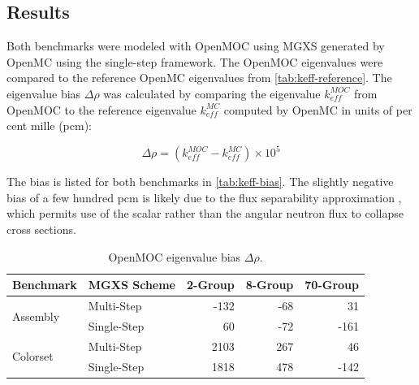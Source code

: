 \subsection{Results}
\label{subsec:results}

Both benchmarks were modeled with OpenMOC using MGXS generated by OpenMC using the single-step framework. The OpenMOC eigenvalues were compared to the reference OpenMC eigenvalues from \autoref{tab:keff-reference}. The eigenvalue bias $\Delta\rho$ was calculated by comparing the eigenvalue $k_{eff}^{MOC}$ from OpenMOC to the reference eigenvalue $k_{eff}^{MC}$ computed by OpenMC in units of per cent mille (pcm):

\begin{equation}
\label{eqn:delta-rho}
\Delta\rho = \left(k_{eff}^{MOC} - k_{eff}^{MC}\right) \times 10^{5}
\end{equation}

The bias is listed for both benchmarks in \autoref{tab:keff-bias}. The slightly negative bias of a few hundred pcm is likely due to the flux separability approximation \cite{boyd2017sph}, which permits use of the scalar rather than the angular neutron flux to collapse cross sections. 


\begin{table}[h!]
  \centering
  \caption{OpenMOC eigenvalue bias $\Delta\rho$.}
  \label{tab:keff-bias} 
  \begin{tabular}{l l r r r}
  \toprule
  \textbf{Benchmark} & \textbf{MGXS Scheme} & \textbf{2-Group} & \textbf{8-Group} & \textbf{70-Group} \\
  \midrule
  \multirow{2}{*}{Assembly} & Multi-Step    & -132 & -68 &   31 \\
                            & Single-Step &   60 & -72 & -161 \\
  \midrule
  \multirow{2}{*}{Colorset} & Multi-Step    & 2103 & 267 &   46 \\
                            & Single-Step & 1818 & 478 & -142 \\
  \bottomrule
\end{tabular}
\end{table}

